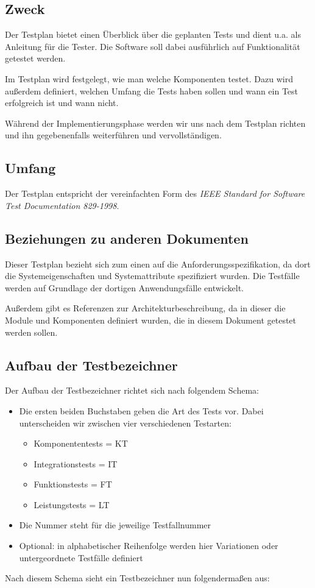 \documentclass[fontsize=12pt,paper=a4,twoside]{scrartcl}
\begin{document}
\subsection{Zweck}
Der Testplan bietet einen Überblick über die geplanten Tests und dient u.a. als Anleitung für die Tester. Die Software soll dabei ausführlich auf Funktionalität getestet werden. 

Im Testplan wird festgelegt, wie man welche Komponenten testet. Dazu wird außerdem definiert, welchen Umfang die Tests haben sollen und wann ein Test erfolgreich ist und wann nicht.

Während der Implementierungsphase werden wir uns nach dem Testplan richten und ihn gegebenenfalls weiterführen und vervollständigen.


\subsection{Umfang}
Der Testplan entspricht der vereinfachten Form des \emph{IEEE Standard for Software Test Documentation 829-1998}. 

\subsection{Beziehungen zu anderen Dokumenten}
Dieser Testplan bezieht sich zum einen auf die Anforderungsspezifikation, da dort die Systemeigenschaften und Systemattribute spezifiziert wurden. Die Testfälle werden auf Grundlage der dortigen Anwendungsfälle entwickelt.

Außerdem gibt es Referenzen zur Architekturbeschreibung, da in dieser die Module und Komponenten definiert wurden, die in diesem Dokument getestet werden sollen.


\subsection{Aufbau der Testbezeichner}
\label{sec:aufb-der-testb}

Der Aufbau der Testbezeichner richtet sich nach folgendem Schema:
\begin{itemize}
\item Die ersten beiden Buchstaben geben die Art des Tests vor. Dabei unterscheiden wir zwischen vier verschiedenen Testarten:
\begin{itemize}
	\item Komponententests = KT
	\item Integrationstests = IT
	\item Funktionstests = FT
	\item Leistungstests = LT
\end{itemize}
\item Die Nummer steht für die jeweilige Testfallnummer

\item Optional: in alphabetischer Reihenfolge werden hier Variationen oder untergeordnete Testfälle definiert
\end{itemize}
Nach diesem Schema sieht ein Testbezeichner nun folgendermaßen aus:
\end{document}
